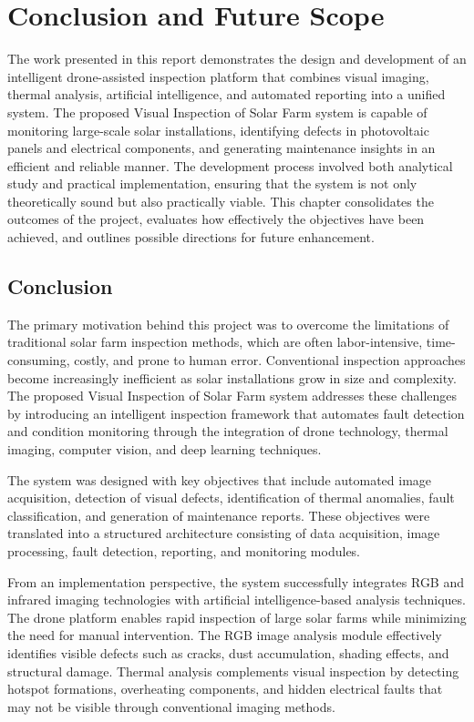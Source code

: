 \chapter{Conclusion and Future Scope}

The work presented in this report demonstrates the design and development of an intelligent drone-assisted inspection platform that combines visual imaging, thermal analysis, artificial intelligence, and automated reporting into a unified system. The proposed Visual Inspection of Solar Farm system is capable of monitoring large-scale solar installations, identifying defects in photovoltaic panels and electrical components, and generating maintenance insights in an efficient and reliable manner. The development process involved both analytical study and practical implementation, ensuring that the system is not only theoretically sound but also practically viable. This chapter consolidates the outcomes of the project, evaluates how effectively the objectives have been achieved, and outlines possible directions for future enhancement.

\section{Conclusion}

The primary motivation behind this project was to overcome the limitations of traditional solar farm inspection methods, which are often labor-intensive, time-consuming, costly, and prone to human error. Conventional inspection approaches become increasingly inefficient as solar installations grow in size and complexity. The proposed Visual Inspection of Solar Farm system addresses these challenges by introducing an intelligent inspection framework that automates fault detection and condition monitoring through the integration of drone technology, thermal imaging, computer vision, and deep learning techniques.

The system was designed with key objectives that include automated image acquisition, detection of visual defects, identification of thermal anomalies, fault classification, and generation of maintenance reports. These objectives were translated into a structured architecture consisting of data acquisition, image processing, fault detection, reporting, and monitoring modules.

From an implementation perspective, the system successfully integrates RGB and infrared imaging technologies with artificial intelligence-based analysis techniques. The drone platform enables rapid inspection of large solar farms while minimizing the need for manual intervention. The RGB image analysis module effectively identifies visible defects such as cracks, dust accumulation, shading effects, and structural damage. Thermal analysis complements visual inspection by detecting hotspot formations, overheating components, and hidden electrical faults that may not be visible through conventional imaging methods.

